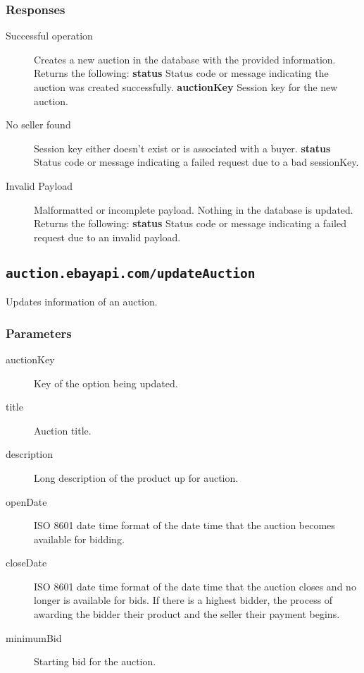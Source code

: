 \documentclass{article}
\newcommand{\code}[1]{\colorbox{light-gray}{\texttt{#1}}}
\begin{document}
\subsubsection{Responses}

\begin{description}
    \item[Successful operation] Creates a new auction in the database with the
        provided information.  Returns the following:
        \subitem\textbf{status} Status code or message indicating the auction was created successfully.
        \subitem\textbf{auctionKey} Session key for the new auction.

    \item[No seller found] Session key either doesn't exist or is associated
        with a buyer.
        \subitem\textbf{status} Status code or message indicating a failed
        request due to a bad sessionKey.

    \item[Invalid Payload] Malformatted or incomplete payload. Nothing
        in the database is updated. Returns the following:
        \subitem\textbf{status} Status code or message indicating a failed
        request due to an invalid payload.

\end{description}

\subsection{\code{auction.ebayapi.com/updateAuction}}
Updates information of an auction. 

\subsubsection{Parameters}

\begin{description}
    \item[auctionKey] Key of the option being updated.
    \item[title] Auction title.
    \item[description] Long description of the product up for auction. 
    \item[openDate] ISO 8601 date time format of the date time that the auction becomes available for bidding.
    \item[closeDate] ISO 8601 date time format of the date time that the
        auction closes and no longer is available for bids. If there is a highest
        bidder, the process of awarding the bidder their product and the seller their
        payment begins. 
    \item[minimumBid] Starting bid for the auction.
\end{description}
\end{document}
